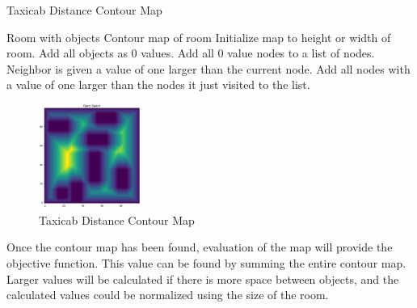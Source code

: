 \documentclass[conference]{IEEEtran}
\begin{document}
    \begin{algorithm}
        \caption{Taxicab Distance Contour Map}
        \label{taxicab_eval}
        \begin{algorithmic}
            \renewcommand{\algorithmicrequire}{\textbf{Input:}}
            \renewcommand{\algorithmicensure}{\textbf{Output:}}
            \REQUIRE Room with objects
            \ENSURE Contour map of room
            \STATE Initialize map to height or width of room.
            \STATE Add all objects as 0 values.
            \STATE Add all 0 value nodes to a list of nodes.
                            \STATE Neighbor is given a value of one larger than the current node.
                        \ENDIF
                    \ENDFOR
                \ENDFOR
                \STATE Add all nodes with a value of one larger than the nodes it just visited to the list.
            \ENDWHILE
        \end{algorithmic}
    \end{algorithm}

    \begin{figure}
        \centering
        \includegraphics[width=0.3\textwidth]{contour_map_taxicab.png}
        \caption{Taxicab Distance Contour Map}
        \label{taxicab_dist_fig}
    \end{figure}

    Once the contour map has been found, evaluation of the map will provide the objective function. This value can be found by summing the entire contour map. Larger values will be calculated if there is more space between objects, and the calculated values could be normalized using the size of the room.
    
\end{document}
